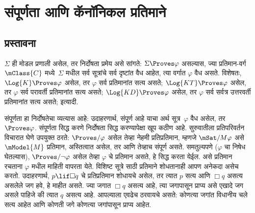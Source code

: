 \chapter{संपूर्णता आणि कॅनॉनिकल प्रतिमाने}\label{nml:com:chap}










\section{प्रस्तावना}\label{nml:com:int:sec}

$\Sigma$ ही मोडल प्रणाली असेल, तर निर्दोषता
प्रमेय असे सांगते: $\Sigma \Proves \varphi$ असल्यास,
ज्या प्रतिमान-वर्ग~$\mClass{C}$ मध्ये~$\Sigma$
मधील सर्व सूत्रांचे सर्व दृष्टांत वैध
आहेत, त्या वर्गात $\varphi$ वैध असते.
विशेषतः, $\Log{K}
\Proves \varphi$ असेल, तर $\varphi$ सर्व प्रतिमानांत
सत्य असते; $\Log{KT} \Proves \varphi$ असेल,
तर $\varphi$ सर्व परावर्ती प्रतिमानांत सत्य असते;
$\Log{KD} \Proves \varphi$ असेल, तर $\varphi$
सर्व सर्वत्र उत्तरवर्ती प्रतिमानांत सत्य असते; इत्यादी.

संपूर्णता हा निर्दोषतेचा व्यत्यास आहे:
उदाहरणार्थ,  संपूर्ण आहे याचा अर्थ
सूत्र~$\varphi$ वैध असेल, तर $\Proves \varphi$.
संपूर्णता सिद्ध करणे निर्दोषता सिद्ध करण्यापेक्षा
खूप कठीण आहे. सुरुवातीला प्रतिपरिवर्तन विचारात
घेणे उपयुक्त ठरते: $\Proves/ \varphi$ असेल तेव्हा
नेहमी प्रतिप्रतिमान, म्हणजे
$\mSat/{M}{\varphi}$ असे~$\mModel{M}$ प्रतिमान,
अस्तित्वात असेल, तर आणि तेव्हाच 
संपूर्ण असते. समतुल्यपणे ($\varphi$ चा निषेध
घेतल्यास), $\Proves/ \lnot \varphi$ असेल तेव्हा
$\varphi$ चे प्रतिमान असते, हे सिद्ध करता येईल.
असे प्रतिमान रचताना $\varphi$ मधील माहिती
वापरता येते. विशिष्ट सूत्रे साठी
प्रतिमाने शोधतानाही आपण अनेकदा असेच करतो.
उदाहरणार्थ, $p \lif \Box q$ चे प्रतिप्रतिमान
शोधायचे असेल, तर त्यात $p$ सत्य आणि
$\Box q$ असत्य असलेले जग हवे, हे माहीत असते.
ज्या जगात $\Box q$ असत्य आहे, त्या जगापासून
प्राप्य असे एखादे जग असले पाहिजे की त्यात $q$
असत्य आहे. आपल्याला एवढेच ठरवायचे असते:
कोणत्या जगांत विधानीय चले
सत्य आहेत आणि कोणती जगे कोणत्या जगांपासून
प्राप्य आहेत.


